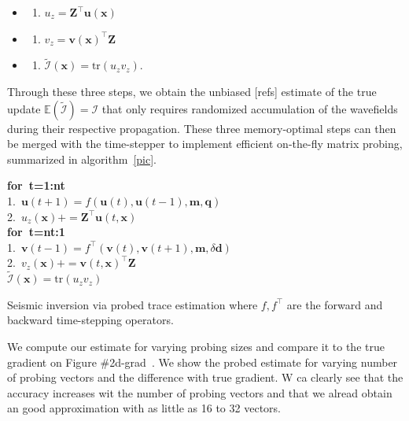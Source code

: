 \documentclass[]{segabs}
\begin{document}
\begin{itemize}
\item
  \begin{enumerate}
  \def\labelenumi{\arabic{enumi}.}
  \itemsep1pt\parskip0pt
  \item
    $u_z = \mathbf{Z}^\top \mathbf{u}(\mathbf{x})$
  \end{enumerate}
\item
  \begin{enumerate}
  \def\labelenumi{\arabic{enumi}.}
  \itemsep1pt\parskip0pt
  \item
    $v_z = \mathbf{v}(\mathbf{x})^\top \mathbf{Z} $
  \end{enumerate}
\item
  \begin{enumerate}
  \def\labelenumi{\arabic{enumi}.}
  \setcounter{enumi}{2}
  \itemsep1pt\parskip0pt
  \item
    $\tilde{\mathcal{I}}(\mathbf{x}) = \text{tr}(u_z v_z)$.
  \end{enumerate}
\end{itemize}

Through these three steps, we obtain the unbiased {[}refs{]} estimate of
the true update $\mathbb{E}(\tilde{\mathcal{I}}) = \mathcal{I}$ that
only requires randomized accumulation of the wavefields during their
respective propagation. These three memory-optimal steps can then be
merged with the time-stepper to implement efficient on-the-fly matrix
probing, summarized in algorithm~\ref{pic}.

\begin{scholmdAlgorithm}
\textbf{for~t=1:nt}\\1.~$\mathbf{u}(t+1) = f(\mathbf{u}(t), \mathbf{u}(t-1), \mathbf{m}, \mathbf{q})$\\2.~$u_z(\mathbf{x}) += \mathbf{Z}^\top \mathbf{u}(t, \mathbf{x})$\\\textbf{for~t=nt:1}\\1.~$\mathbf{v}(t-1) = f^\top(\mathbf{v}(t), \mathbf{v}(t+1), \mathbf{m}, δ \mathbf{d})$\\2.~$v_z(\mathbf{x}) += \mathbf{v}(t, \mathbf{x})^\top \mathbf{Z}$\\$\tilde{\mathcal{I}}(\mathbf{x}) = \text{tr}(u_z v_z)$
\caption{Seismic inversion via probed trace estimation where $f, f^\top$
are the forward and backward time-stepping operators.}\label{pic}
\end{scholmdAlgorithm}

We compute our estimate for varying probing sizes and compare it to the
true gradient on Figure \#2d-grad~. We show the probed estimate for
varying number of probing vectors and the difference with true gradient.
W ca clearly see that the accuracy increases wit the number of probing
vectors and that we alread obtain an good approximation with as little
as 16 to 32 vectors.
\end{document}
